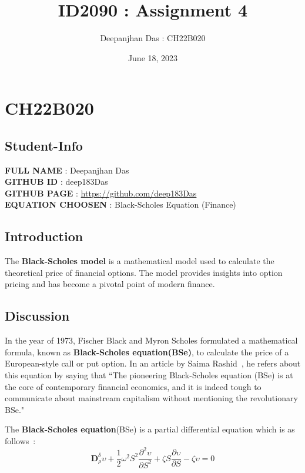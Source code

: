 \documentclass[12pt,a4paper]{article}
\title{ID2090 : Assignment 4}
\author{Deepanjhan Das : CH22B020}
\date{June 18, 2023}
\begin{document}
\maketitle
\thispagestyle{empty}
\vspace{1cm}
\section{CH22B020}
\subsection{Student-Info}
\textbf{FULL NAME} : Deepanjhan Das \\
\textbf{GITHUB ID} : deep183Das \\
\textbf{GITHUB PAGE} : \url{https://github.com/deep183Das}  \\
\textbf{EQUATION CHOOSEN} : Black-Scholes Equation (Finance) \\

\subsection{Introduction}

The \textbf{Black-Scholes model} is a mathematical model used to calculate the theoretical price of financial options. The model provides insights into option pricing and has become a pivotal point of modern finance.

\subsection{Discussion}

In the year of 1973, Fischer Black and Myron Scholes formulated a mathematical formula, known as \textbf{Black-Scholes equation(BSe)}, to calculate the price of a European-style call or put option. In an article by Saima Rashid~\footnotemark[1], he refers about this equation by saying that ``The pioneering Black-Scholes equation (BSe) is at the core
of contemporary financial economics, and it is indeed tough
to communicate about mainstream capitalism without mentioning the revolutionary BSe."


The \textbf{Black-Scholes equation}(BSe) is a partial differential equation which is as follows~\footnotemark[2] :
\begin{equation}
    \textbf{D}_\rho^\delta\upsilon + \frac{{1}}{{2}}\omega^2S^2\frac{{\partial^2\upsilon}}{{\partial S^2}} + \zeta S\frac{\partial\upsilon}{{\partial S}} - \zeta\upsilon = 0
    \label{eq1}
\end{equation}
\end{document}
